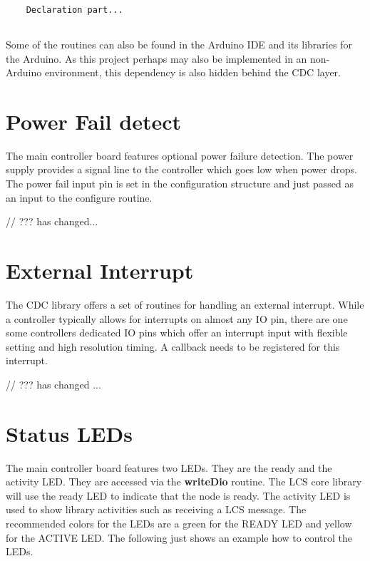 \lstset{language=c++, style=codesnippetstyle}
\begin{lstlisting}
   
    Declaration part...
    
\end{lstlisting}

Some of the routines can also be found in the Arduino IDE and its libraries for the Arduino. As this project perhaps may also be implemented in an non-Arduino environment, this dependency is also hidden behind the CDC layer.

\section{Power Fail detect}

The main controller board features optional power failure detection. The power supply provides a signal line to the controller which goes low when power drops. The power fail input pin is set in the configuration structure and just passed as an input to the configure routine. 


// ??? has changed...



\section{External Interrupt}

The CDC library offers a set of routines for handling an external interrupt. While a controller typically allows for interrupts on almost any IO pin, there are one some controllers dedicated IO pins which offer an interrupt input with flexible setting and high resolution timing. A callback needs to be registered for this interrupt.

// ??? has changed ...


\section{Status LEDs}

The main controller board features two LEDs. They are the ready and the activity LED. They are accessed via the \textbf{writeDio} routine. The LCS core library will use the ready LED to indicate that the node is ready. The activity LED is used to show library activities such as receiving a LCS message. The recommended colors for the LEDs are a green for the READY LED and yellow for the ACTIVE LED. The following just shows an example how to control the LEDs.

